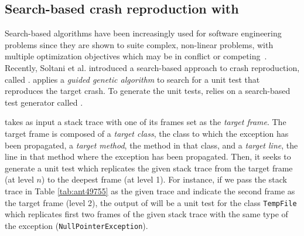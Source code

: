 
\subsection{Search-based crash reproduction with \evocrash}

Search-based algorithms have been increasingly used for software engineering problems since they are shown to suite complex, non-linear problems, with multiple optimization objectives which may be in conflict or competing~\cite{harman12trends}.
Recently, Soltani et al. \cite{soltani2017,Soltani2018a} introduced a search-based approach to crash reproduction, called \evocrash.
\evocrash applies a \textit{guided genetic algorithm} to search for a unit test that reproduces the target crash.
To generate the unit tests, \evocrash relies on a search-based test generator called \evosuite \cite{fraser2012whole}.

\evocrash takes as input a stack trace with one of its frames set as the \emph{target frame}. 
The target frame is composed of a \emph{target class}, the class to which the exception has been propagated, a \emph{target method}, the method in that class, and a \emph{target line}, the line in that method where the exception has been propagated. 
Then, it seeks to generate a unit test which replicates the given stack trace from the target frame (at level $n$) to the deepest frame (at level 1). 
For instance, if we pass the stack trace in Table \ref{tab:ant49755} as the given trace and indicate the second frame as the target frame (level 2), the output of \evocrash will be a unit test for the class \texttt{TempFile} which replicates first two frames of the given stack trace with the same type of the exception (\texttt{NullPointerException}).

